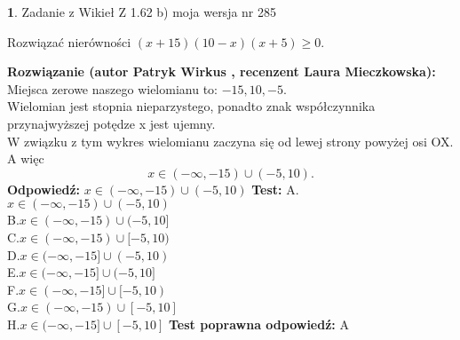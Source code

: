 \documentclass[12pt, a4paper]{article}
\theoremstyle{definition} %
\newtheorem{zad}{}
\newcommand{\zadStart}[1]{\begin{zad}#1\newline}
\newcommand{\zadStop}{\end{zad}}
\newcommand{\rozwStart}[2]{\noindent \textbf{Rozwiązanie (autor #1 , recenzent #2): }\newline}
\newcommand{\rozwStop}{\newline}
\newcommand{\odpStart}{\noindent \textbf{Odpowiedź:}\newline}
\newcommand{\odpStop}{\newline}
\newcommand{\testStart}{\noindent \textbf{Test:}\newline}
\newcommand{\testStop}{\newline}
\newcommand{\kluczStart}{\noindent \textbf{Test poprawna odpowiedź:}\newline}
\newcommand{\kluczStop}{\newline}
\begin{document}
\zadStart{Zadanie z Wikieł Z 1.62 b) moja wersja nr 285}

Rozwiązać nierówności $(x+15)(10-x)(x+5)\ge0$.
\zadStop
\rozwStart{Patryk Wirkus}{Laura Mieczkowska}
Miejsca zerowe naszego wielomianu to: $-15, 10, -5$.\\
Wielomian jest stopnia nieparzystego, ponadto znak współczynnika przy\linebreak najwyższej potędze x jest ujemny.\\ W związku z tym wykres wielomianu zaczyna się od lewej strony powyżej osi OX. A więc $$x \in (-\infty,-15) \cup (-5,10).$$
\rozwStop
\odpStart
$x \in (-\infty,-15) \cup (-5,10)$
\odpStop
\testStart
A.$x \in (-\infty,-15) \cup (-5,10)$\\
B.$x \in (-\infty,-15) \cup (-5,10]$\\
C.$x \in (-\infty,-15) \cup [-5,10)$\\
D.$x \in (-\infty,-15] \cup (-5,10)$\\
E.$x \in (-\infty,-15] \cup (-5,10]$\\
F.$x \in (-\infty,-15] \cup [-5,10)$\\
G.$x \in (-\infty,-15) \cup [-5,10]$\\
H.$x \in (-\infty,-15] \cup [-5,10]$
\testStop
\kluczStart
A
\kluczStop
\end{document}
